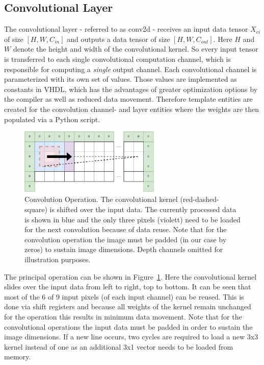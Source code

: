 \subsection{Convolutional Layer}

The convolutional layer - referred to as conv2d - receives an input data tensor $X_{ci} $ of size $[H, W, C_{in}]$ and outputs a data tensor of size $[H,W,C_{out}]$. Here $H$ and $W$ denote the height and width of the convolutional kernel. So every input tensor is transferred to each single convolutional computation channel, which is responsible for computing a \emph{single} output channel. Each convolutional channel is parameterized with its own set of values. Those values are implemented as constants in VHDL, which has the advantages of greater optimization options by the compiler as well as reduced data movement. Therefore template entities are created for the convolution channel- and layer entities where the weights are then populated via a Python script.

\begin{figure}[hb]
	\centering
	\includegraphics[width=0.6\textwidth]{img/convolution.pdf}
	\caption[Convolution Operation]{Convolution Operation. The convolutional kernel (red-dashed-square) is shifted over the input data. The currently processed data is shown in blue and the only three pixels (violett) need to be loaded for the next convolution because of data reuse. Note that for the convolution operation the image must be padded (in our case by zeros) to sustain image dimensions. Depth channels omitted for illustration purposes.}
	\label{fig:hw-conv-operation}
\end{figure}

The principal operation can be shown in Figure~\ref{fig:hw-conv-operation}. Here the convolutional kernel slides over the input data from left to right, top to bottom. It can be seen that most of the $6$ of $9$ input pixels (of each input channel) can be reused. This is done via shift registers and because all weights of the kernel remain unchanged for the operation this results in minimum data movement. Note that for the convolutional operations the input data must be padded in order to sustain the image dimensions. If a new line occurs, two cycles are required to load a new 3x3 kernel instead of one as an additional 3x1 vector needs to be loaded from memory. 


